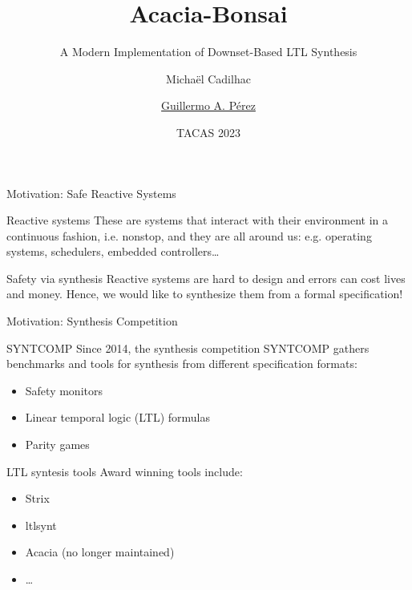 \documentclass[aspectratio=169]{beamer}
\title{Acacia-Bonsai}
\subtitle{A Modern Implementation of Downset-Based LTL Synthesis}
\author{Micha\"el Cadilhac \and \underline{Guillermo A. P\'erez}}
\date{TACAS 2023}
\begin{document}
\begin{frame}
	\titlepage
\end{frame}

\begin{frame}{Motivation: Safe Reactive Systems}
  \begin{block}{Reactive systems}
    These are systems that interact with their environment in a
    \alert{continuous} fashion, i.e. nonstop, and they are all around us:
    e.g. operating systems, schedulers, embedded controllers\dots
  \end{block}
  \begin{center}
  \end{center}
  \pause
  \begin{block}{Safety via synthesis}
    Reactive systems are hard to design and errors can \alert{cost lives} and
    money. Hence, we would like to \alert{synthesize them} from a formal
    specification!
  \end{block}
\end{frame}

\begin{frame}{Motivation: Synthesis Competition}
  \begin{block}{SYNTCOMP}
    Since 2014, the synthesis competition SYNTCOMP gathers benchmarks and
    tools for synthesis from different specification formats:
    \begin{itemize}
      \item Safety monitors
      \item \alert{Linear temporal logic (LTL) formulas}
      \item Parity games
    \end{itemize}
  \end{block}
  \pause
  \begin{block}{LTL syntesis tools}
    Award winning tools include:
    \begin{itemize}
      \item Strix
      \item ltlsynt
      \item \alert{Acacia (no longer maintained)}
      \item \dots
    \end{itemize}
  \end{block}
\end{frame}
\end{document}
